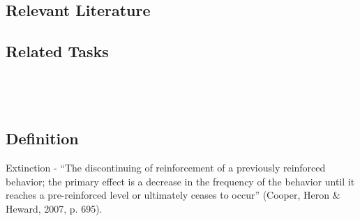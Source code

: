 \subsection{Relevant Literature}
\begin{refsection}
\nocite{test,alang2017police,clayton2018black}
\printbibliography[heading=none]
\end{refsection}
%
\subsection{Related Tasks} 
\fourdTwo{}\\
\fourdSeventeen{}\\
%
%
%
%
%
%
\section{\fourFKTwentyTwo{}}
\subsection{Definition}
Extinction - ``The discontinuing of reinforcement of a previously reinforced behavior; the primary effect is a decrease in the frequency of the behavior until it reaches a pre-reinforced level or ultimately ceases to occur'' (Cooper, Heron \& Heward, 2007, p. 695).
%
